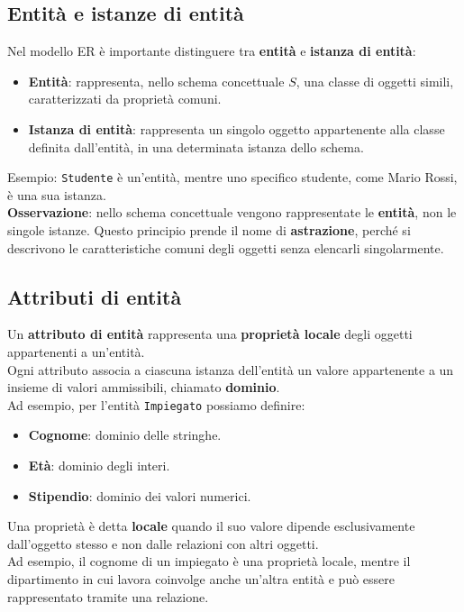 \subsection*{Entità e istanze di entità}

Nel modello ER è importante distinguere tra \textbf{entità} e \textbf{istanza di entità}:
\begin{itemize}
    \item \textbf{Entità}: rappresenta, nello schema concettuale $S$, una classe di oggetti simili, caratterizzati da proprietà comuni.
    \item \textbf{Istanza di entità}: rappresenta un singolo oggetto appartenente alla classe definita dall'entità, in una determinata istanza dello schema.
\end{itemize}
\noindent \textcolor{verdeEsempio}{Esempio}: \texttt{Studente} è un'entità, mentre uno specifico studente, come Mario Rossi, è una sua istanza.\\
\textbf{Osservazione}: nello schema concettuale vengono rappresentate le \textbf{entità}, non le singole istanze. Questo principio prende il nome di \textbf{astrazione}, perché si descrivono le caratteristiche comuni degli oggetti senza elencarli singolarmente.

\subsection{Attributi di entità}

Un \textbf{attributo di entità} rappresenta una \textbf{proprietà locale} degli oggetti appartenenti a un'entità.\\
Ogni attributo associa a ciascuna istanza dell'entità un valore appartenente a un insieme di valori ammissibili, chiamato \textbf{dominio}.\\
Ad esempio, per l'entità \texttt{Impiegato} possiamo definire:
\begin{itemize}
    \item \textbf{Cognome}: dominio delle stringhe.
    \item \textbf{Età}: dominio degli interi.
    \item \textbf{Stipendio}: dominio dei valori numerici.
\end{itemize}
\noindent Una proprietà è detta \textbf{locale} quando il suo valore dipende esclusivamente dall'oggetto stesso e non dalle relazioni con altri oggetti.\\
Ad esempio, il cognome di un impiegato è una proprietà locale, mentre il dipartimento in cui lavora coinvolge anche un'altra entità e può essere rappresentato tramite una relazione.


